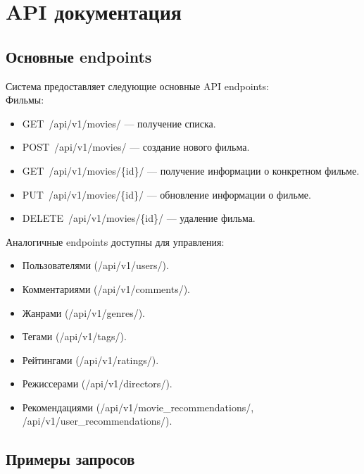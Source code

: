 \hypertarget{api-ux434ux43eux43aux443ux43cux435ux43dux442ux430ux446ux438ux44f}{%
\section{API
документация}\label{api-ux434ux43eux43aux443ux43cux435ux43dux442ux430ux446ux438ux44f}}

\hypertarget{ux43eux441ux43dux43eux432ux43dux44bux435-endpoints}{%
\subsection*{Основные
endpoints}\label{ux43eux441ux43dux43eux432ux43dux44bux435-endpoints}}

Система предоставляет следующие основные API endpoints: \\
Фильмы: 
\begin{itemize}
    \item GET\ /api/v1/movies/ --- получение списка.
    \item POST\ /api/v1/movies/ --- создание нового фильма.
    \item GET\ /api/v1/movies/\{id\}/ --- получение информации о
конкретном фильме.
    \item PUT\ /api/v1/movies/\{id\}/ --- обновление
информации о фильме.
    \item DELETE\ /api/v1/movies/\{id\}/ ---
удаление фильма.
\end{itemize}  

Аналогичные endpoints доступны для управления: 
\begin{itemize}
    \item 
Пользователями
(/api/v1/users/). 
    \item 
Комментариями
(/api/v1/comments/). 
    \item 
Жанрами
(/api/v1/genres/). 
    \item 
Тегами (/api/v1/tags/).
    \item 
Рейтингами (/api/v1/ratings/). 
    \item 
Режиссерами (/api/v1/directors/). 
    \item 
Рекомендациями (/api/v1/movie\_recommendations/, /api/v1/user\_recommendations/).
\end{itemize}

\hypertarget{ux43fux440ux438ux43cux435ux440ux44b-ux437ux430ux43fux440ux43eux441ux43eux432}{%
\subsection*{Примеры
запросов}\label{ux43fux440ux438ux43cux435ux440ux44b-ux437ux430ux43fux440ux43eux441ux43eux432}}

